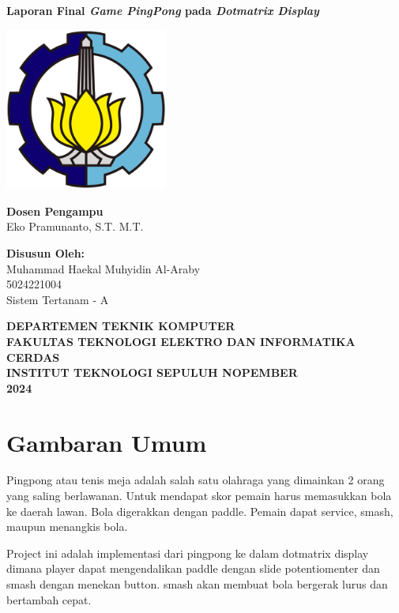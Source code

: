 \documentclass[a4paper,12pt]{article}
\begin{document}
\begin{titlepage}
    \centering
    \vspace*{1cm}
    {\Large \textbf{Laporan Final \textit{Game PingPong} pada \textit{Dotmatrix Display}}}
    \vfill
    \vspace{2cm}

    \includegraphics[width=0.4\textwidth]{./images/logo.png}
    \vfill

    \vspace{1cm}
    \begin{onehalfspace}
    \textbf{Dosen Pengampu}\\
    Eko Pramunanto, S.T. M.T.

    \vspace{1cm}

    \textbf{Disusun Oleh:}\\
    Muhammad Haekal Muhyidin Al-Araby\\
    5024221004\\
    Sistem Tertanam - A
    \end{onehalfspace}

    \vfill

    \textbf{DEPARTEMEN TEKNIK KOMPUTER\\
    FAKULTAS TEKNOLOGI ELEKTRO DAN INFORMATIKA CERDAS\\
    INSTITUT TEKNOLOGI SEPULUH NOPEMBER\\2024}
\end{titlepage}

\section{Gambaran Umum}
Pingpong atau tenis meja adalah salah satu olahraga yang dimainkan 2 orang yang saling berlawanan.
Untuk mendapat skor pemain harus memasukkan bola ke daerah lawan. Bola digerakkan dengan paddle. Pemain dapat
service, smash, maupun menangkis bola.

Project ini adalah implementasi dari pingpong ke dalam dotmatrix display dimana
player dapat mengendalikan paddle dengan slide potentiomenter dan smash dengan menekan button.
smash akan membuat bola bergerak lurus dan bertambah cepat.
\end{document}
